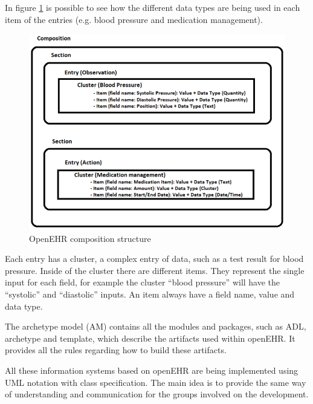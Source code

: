 \documentclass[mim_thesis.tex]{subfiles}
\begin{document}
In figure \ref{fig:openehr_comp_struct} is possible to see how the different data types are being used in each item of the entries (e.g. blood pressure and medication management). 

\begin{figure}[H]
	\centering
    \includegraphics[width=1\textwidth]{img/openehr_comp_struct.PNG}
	\caption{OpenEHR composition structure}
	\label{fig:openehr_comp_struct}
\end{figure}

Each entry has a cluster, a complex entry of data, such as a test result for blood pressure. Inside of the cluster there are different items. They represent the single input for each field, for example the cluster “blood pressure” will have the “systolic” and “diastolic” inputs. An item always have a field name, value and data type. 

The archetype model (AM) contains all the modules and packages, such as \ac{ADL}, archetype and template, which describe the artifacts used within openEHR. It provides all the rules regarding how to build these artifacts. 

All these information systems based on openEHR are being implemented using UML notation with class specification. The main idea is to provide the same way of understanding and communication for the groups involved on the development. 
\end{document}

